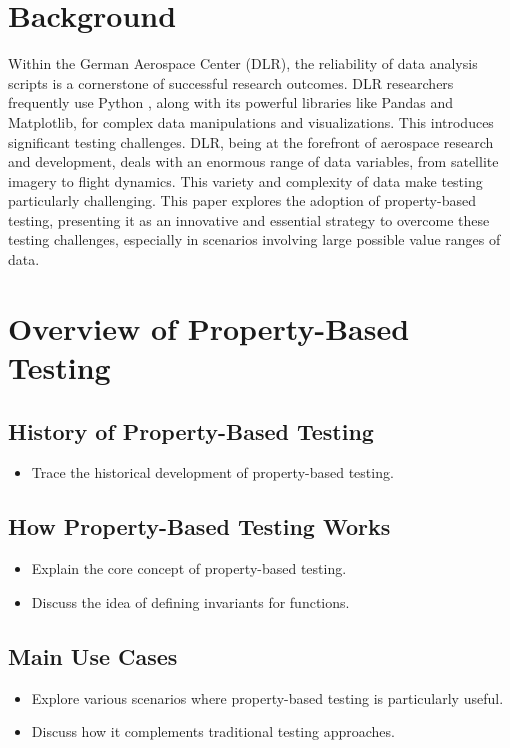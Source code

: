 \documentclass[runningheads]{llncs}
\begin{document}
\section{Background}
Within the German Aerospace Center (DLR), the reliability of data analysis scripts is a cornerstone of successful research outcomes. DLR researchers frequently use Python \cite{Kurnatowski2020}, along with its powerful libraries like Pandas and Matplotlib, for complex data manipulations and visualizations. This introduces significant testing challenges. DLR, being at the forefront of aerospace research and development, deals with an enormous range of data variables, from satellite imagery to flight dynamics. This variety and complexity of data make testing particularly challenging. This paper explores the adoption of property-based testing, presenting it as an innovative and essential strategy to overcome these testing challenges, especially in scenarios involving large possible value ranges of data.

\section{Overview of Property-Based Testing}
\subsection{History of Property-Based Testing}
\begin{itemize}
  \item Trace the historical development of property-based testing.
\end{itemize}

\subsection{How Property-Based Testing Works}
\begin{itemize}
  \item Explain the core concept of property-based testing.
  \item Discuss the idea of defining invariants for functions.
\end{itemize}

\subsection{Main Use Cases}
\begin{itemize}
  \item Explore various scenarios where property-based testing is particularly useful.
  \item Discuss how it complements traditional testing approaches.
\end{itemize}
\end{document}
